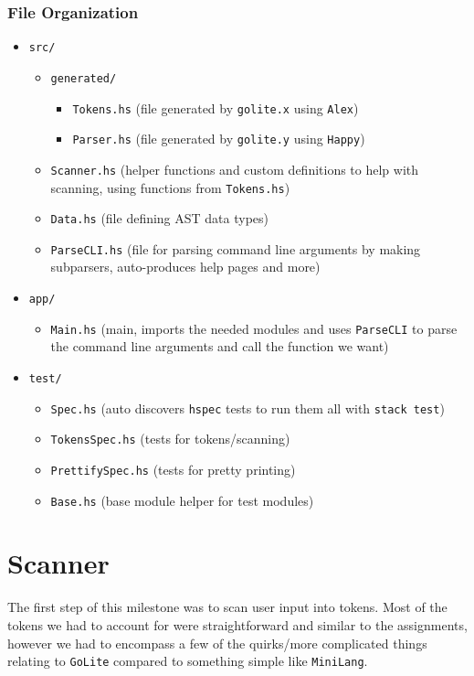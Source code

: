 \documentclass[11pt]{article}
\begin{document}
\subsubsection{File Organization}
\label{sec:org1a1231a}
\begin{itemize}
\item \texttt{src/}
\begin{itemize}
\item \texttt{generated/}
\begin{itemize}
\item \texttt{Tokens.hs} (file generated by \texttt{golite.x} using \texttt{Alex})
\item \texttt{Parser.hs} (file generated by \texttt{golite.y} using \texttt{Happy})
\end{itemize}
\item \texttt{Scanner.hs} (helper functions and custom definitions to help
with scanning, using functions from \texttt{Tokens.hs})
\item \texttt{Data.hs} (file defining AST data types)
\item \texttt{ParseCLI.hs} (file for parsing command line arguments by
making subparsers, auto-produces help pages and more)
\end{itemize}
\item \texttt{app/}
\begin{itemize}
\item \texttt{Main.hs} (main, imports the needed modules and uses
\texttt{ParseCLI} to parse the command line arguments and call the
function we want)
\end{itemize}
\item \texttt{test/}
\begin{itemize}
\item \texttt{Spec.hs} (auto discovers \texttt{hspec} tests to run them all with
\texttt{stack test})
\item \texttt{TokensSpec.hs} (tests for tokens/scanning)
\item \texttt{PrettifySpec.hs} (tests for pretty printing)
\item \texttt{Base.hs} (base module helper for test modules)
\end{itemize}
\end{itemize}
\section{Scanner}
\label{sec:org33a86f1}
The first step of this milestone was to scan user input into
tokens. Most of the tokens we had to account for were straightforward
and similar to the assignments, however we had to encompass a few of
the quirks/more complicated things relating to \texttt{GoLite} compared to
something simple like \texttt{MiniLang}.
\end{document}
